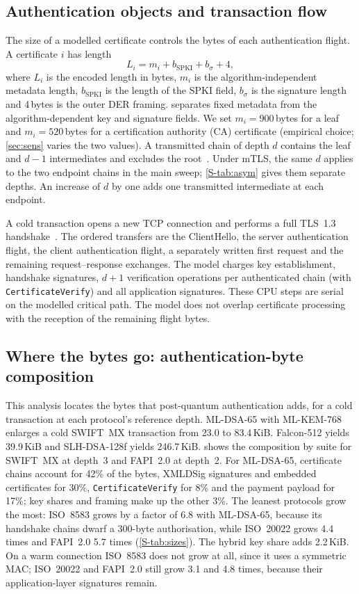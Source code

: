 \documentclass[preprint,12pt]{elsarticle}
\begin{document}
\subsection{Authentication objects and transaction flow}
The size of a modelled certificate controls the bytes of each authentication flight. A certificate $i$ has length
\begin{equation}
L_i=m_i+b_\mathrm{SPKI}+b_\sigma+4,
\label{eq:cert}
\end{equation}
where $L_i$ is the encoded length in bytes, $m_i$ is the algorithm-independent metadata length, $b_\mathrm{SPKI}$ is the length of the SPKI field, $b_\sigma$ is the signature length and 4\,bytes is the outer DER framing.  separates fixed metadata from the algorithm-dependent key and signature fields. We set $m_i=900$\,bytes for a leaf and $m_i=520$\,bytes for a certification authority (CA) certificate (empirical choice; \cref{sec:sens} varies the two values). A transmitted chain of depth $d$ contains the leaf and $d-1$ intermediates and excludes the root~\cite{rfc5280}. Under mTLS, the same $d$ applies to the two endpoint chains in the main sweep; \cref{S-tab:asym} gives them separate depths. An increase of $d$ by one adds one transmitted intermediate at each endpoint.

A cold transaction opens a new TCP connection and performs a full TLS~1.3 handshake~\cite{rfc8446}. The ordered transfers are the ClientHello, the server authentication flight, the client authentication flight, a separately written first request and the remaining request--response exchanges. The model charges key establishment, handshake signatures, $d+1$ verification operations per authenticated chain (with \texttt{CertificateVerify}) and all application signatures. These CPU steps are serial on the modelled critical path. The model does not overlap certificate processing with the reception of the remaining flight bytes.

\subsection{Where the bytes go: authentication-byte composition}
This analysis locates the bytes that post-quantum authentication adds, for a cold transaction at each protocol's reference depth. ML-DSA-65 with ML-KEM-768 enlarges a cold SWIFT~MX transaction from 23.0 to 83.4\,KiB. Falcon-512 yields 39.9\,KiB and SLH-DSA-128f yields 246.7\,KiB.  shows the composition by suite for SWIFT~MX at depth~3 and FAPI~2.0 at depth~2. For ML-DSA-65, certificate chains account for 42\% of the bytes, XMLDSig signatures and embedded certificates for 30\%, \texttt{CertificateVerify} for 8\% and the payment payload for 17\%; key shares and framing make up the other 3\%. The leanest protocols grow the most: ISO~8583 grows by a factor of 6.8 with ML-DSA-65, because its handshake chains dwarf a 300-byte authorisation, while ISO~20022 grows 4.4 times and FAPI~2.0 5.7 times (\cref{S-tab:sizes}). The hybrid key share adds 2.2\,KiB. On a warm connection ISO~8583 does not grow at all, since it uses a symmetric MAC; ISO~20022 and FAPI~2.0 still grow 3.1 and 4.8 times, because their application-layer signatures remain.
\end{document}
